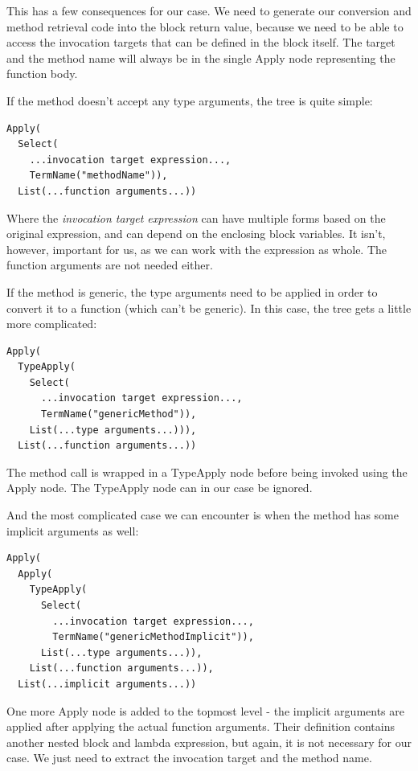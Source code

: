This has a few consequences for our case. We need to generate our conversion and method retrieval code into the block return value, because we need to be able to access the invocation targets that can be defined in the block itself. The target and the method name will always be in the single Apply node representing the function body.

If the method doesn't accept any type arguments, the tree is quite simple:

\lstset{style=Dump}
\begin{lstlisting}
Apply(
  Select(
    ...invocation target expression..., 
    TermName("methodName")), 
  List(...function arguments...))
\end{lstlisting}

Where the \textit{invocation target expression} can have multiple forms based on the original expression, and can depend on the enclosing block variables. It isn't, however, important for us, as we can work with the expression as whole. The function arguments are not needed either.

If the method is generic, the type arguments need to be applied in order to convert it to a function (which can't be generic). In this case, the tree gets a little more complicated:

\lstset{style=Dump}
\begin{lstlisting}
Apply(
  TypeApply(
    Select(
      ...invocation target expression..., 
      TermName("genericMethod")), 
    List(...type arguments...))), 
  List(...function arguments...))
\end{lstlisting}

The method call is wrapped in a TypeApply node before being invoked using the Apply node. The TypeApply node can in our case be ignored.

And the most complicated case we can encounter is when the method has some implicit arguments as well:

\lstset{style=Dump}
\begin{lstlisting}
Apply(
  Apply(
    TypeApply(
      Select(
        ...invocation target expression...,
        TermName("genericMethodImplicit")), 
      List(...type arguments...)), 
    List(...function arguments...)), 
  List(...implicit arguments...))
\end{lstlisting}

One more Apply node is added to the topmost level - the implicit arguments are applied after applying the actual function arguments. Their definition contains another nested block and lambda expression, but again, it is not necessary for our case. We just need to extract the invocation target and the method name.

